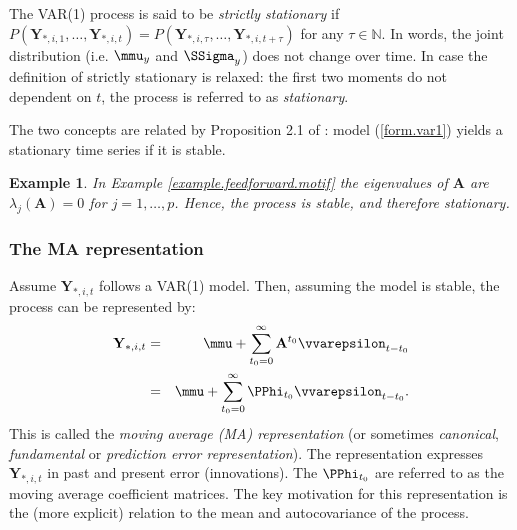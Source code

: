 \documentclass[a4paper]{article}
\theoremstyle{myexamplestyle}
\newtheorem{example}{Example}
\begin{document}
The VAR(1) process is said to be {\it strictly stationary} if $P(\mathbf{Y}_{\ast,i,1}, \ldots, \mathbf{Y}_{\ast,i,t} ) = P(\mathbf{Y}_{\ast,i,\tau}, \ldots, \mathbf{Y}_{\ast,i,t+\tau} )$ for any $\tau \in \mathbb{N}$. In words, the joint distribution (i.e. $\mmu_y$ and $\SSigma_y$) does not change over time. In case the definition of strictly stationary is relaxed: the first two moments do not dependent on $t$, the process is referred to as \textit{stationary}.

The two concepts are related by Proposition 2.1 of \cite{Luet2005}: model (\ref{form.var1}) yields a stationary time series if it is stable.
\begin{example}
In Example \ref{example.feedforward.motif} the eigenvalues of $\mathbf{A}$ are $\lambda_j(\mathbf{A}) = 0$ for $j=1, \ldots, p$. Hence, the process is stable, and therefore stationary.
\end{example}




\subsubsection{The MA representation}
Assume $\mathbf{Y}_{\ast, i, t}$ follows a VAR(1) model. Then, assuming the model is stable, the process can be represented by:
\begin{eqnarray*}
\mathbf{Y}_{\ast, i, t} & = & \mmu + \sum_{t_0 = 0}^{\infty} \mathbf{A}^{t_0} \vvarepsilon_{t - t_0}
\\
& = & \mmu + \sum_{t_0 = 0}^{\infty} \PPhi_{t_0} \vvarepsilon_{t - t_0}.
\end{eqnarray*}
This is called the {\it moving average (MA) representation} (or sometimes {\it canonical}, {\it fundamental} or {\it prediction error representation}). The representation expresses $\mathbf{Y}_{\ast, i, t}$ in past and present error (innovations). The $\PPhi_{t_0}$ are referred to as the moving average coefficient matrices. The key motivation for this representation is the (more explicit) relation to the mean and autocovariance of the process.
\end{document}
